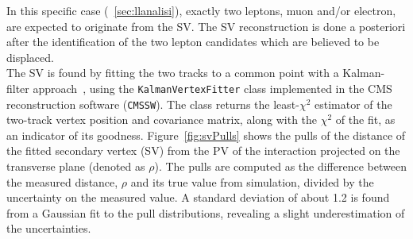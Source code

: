 In this specific case (~\ref{sec:llanalisi}), exactly two leptons, muon and/or electron, are
expected to originate from the SV. The SV reconstruction is done a
posteriori after the identification of the two lepton candidates which
are believed to be displaced. \\
The SV is found by fitting the two tracks to a common point with a Kalman-filter
approach~\cite{BILLOIR1990219}, using the \texttt{KalmanVertexFitter}
class implemented in the CMS reconstruction software (\texttt{CMSSW}).
The class returns the least-$\chi^2$ estimator of the two-track vertex
position and covariance matrix, along with the $\chi^2$ of the fit, as
an indicator of its goodness.
Figure~\ref{fig:svPulls} shows the pulls of the distance of the fitted
secondary vertex (SV) from the PV of the interaction projected on the
transverse plane (denoted as $\rho$). The pulls
are computed as the difference between the measured distance, $\rho$
and its true value from simulation, divided by the uncertainty
on the measured value. A standard deviation of about 1.2 is found from
a Gaussian fit to the pull distributions, revealing a slight
underestimation of the uncertainties.
